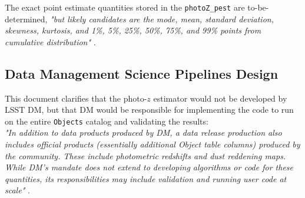 \documentclass[DM,lsstdraft,toc]{lsstdoc}
\begin{document}
The exact point estimate quantities stored in the \texttt{photoZ\_pest} are to-be-determined, {\it "but likely candidates are the mode, mean, standard deviation, skewness, kurtosis, and 1\%, 5\%, 25\%, 50\%, 75\%, and 99\% points from cumulative distribution"} . 

\subsection{Data Management Science Pipelines Design}\label{ssec:docs_ldm151}

This document clarifies that the photo-$z$ estimator would not be developed by LSST DM, but that DM would be responsible for implementing the code to run on the entire {\tt Objects} catalog and validating the results: \\
{\it "In addition to data products produced by DM, a data release production also includes official
products (essentially additional Object table columns) produced by the community. These
include photometric redshifts and dust reddening maps. While DM's mandate does not extend
to developing algorithms or code for these quantities, its responsibilities may include validation
and running user code at scale"} .
\end{document}
